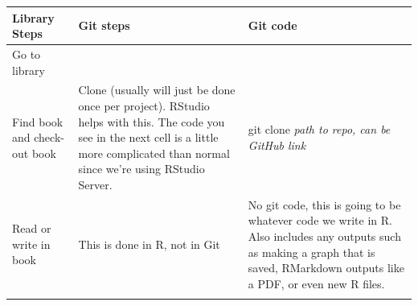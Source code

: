 \documentclass[
  12pt,
]{book}
\begin{document}
\begin{longtable}[]{@{}lll@{}}
\toprule
\begin{minipage}[b]{0.30\columnwidth}\raggedright
Library Steps\strut
\end{minipage} & \begin{minipage}[b]{0.30\columnwidth}\raggedright
Git steps\strut
\end{minipage} & \begin{minipage}[b]{0.30\columnwidth}\raggedright
Git code\strut
\end{minipage}\tabularnewline
\midrule
\endhead
\begin{minipage}[t]{0.30\columnwidth}\raggedright
Go to library\strut
\end{minipage} & \begin{minipage}[t]{0.30\columnwidth}\raggedright
\strut
\end{minipage} & \begin{minipage}[t]{0.30\columnwidth}\raggedright
\strut
\end{minipage}\tabularnewline
\begin{minipage}[t]{0.30\columnwidth}\raggedright
Find book and check-out book\strut
\end{minipage} & \begin{minipage}[t]{0.30\columnwidth}\raggedright
Clone (usually will just be done once per project). RStudio helps with this. The code you see in the next cell is a little more complicated than normal since we're using RStudio Server.\strut
\end{minipage} & \begin{minipage}[t]{0.30\columnwidth}\raggedright
git clone \emph{path to repo, can be GitHub link}\strut
\end{minipage}\tabularnewline
\begin{minipage}[t]{0.30\columnwidth}\raggedright
Read or write in book\strut
\end{minipage} & \begin{minipage}[t]{0.30\columnwidth}\raggedright
This is done in R, not in Git\strut
\end{minipage} & \begin{minipage}[t]{0.30\columnwidth}\raggedright
No git code, this is going to be whatever code we write in R. Also includes any outputs such as making a graph that is saved, RMarkdown outputs like a PDF, or even new R files.\strut
\end{minipage}\tabularnewline
\begin{minipage}[t]{0.30\columnwidth}\raggedright

\end{minipage}
\end{longtable}
\end{document}
